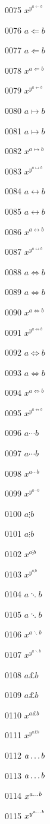 \documentclass{article}
\begin{document}
0075 $x^{y^{a\longleftarrow b}}$\par
0076 $a\Longleftarrow b$\par
0077 $\displaystyle a\Longleftarrow b$\par
0078 $x^{a\Longleftarrow b}$\par
0079 $x^{y^{a\Longleftarrow b}}$\par
0080 $a\longmapsto b$\par
0081 $\displaystyle a\longmapsto b$\par
0082 $x^{a\longmapsto b}$\par
0083 $x^{y^{a\longmapsto b}}$\par
0084 $a\longleftrightarrow b$\par
0085 $\displaystyle a\longleftrightarrow b$\par
0086 $x^{a\longleftrightarrow b}$\par
0087 $x^{y^{a\longleftrightarrow b}}$\par
0088 $a\Longleftrightarrow b$\par
0089 $\displaystyle a\Longleftrightarrow b$\par
0090 $x^{a\Longleftrightarrow b}$\par
0091 $x^{y^{a\Longleftrightarrow b}}$\par
0092 $a\iff b$\par
0093 $\displaystyle a\iff b$\par
0094 $x^{a\iff b}$\par
0095 $x^{y^{a\iff b}}$\par
0096 $a\cdots b$\par
0097 $\displaystyle a\cdots b$\par
0098 $x^{a\cdots b}$\par
0099 $x^{y^{a\cdots b}}$\par
0100 $a\vdots b$\par
0101 $\displaystyle a\vdots b$\par
0102 $x^{a\vdots b}$\par
0103 $x^{y^{a\vdots b}}$\par
0104 $a\ddots b$\par
0105 $\displaystyle a\ddots b$\par
0106 $x^{a\ddots b}$\par
0107 $x^{y^{a\ddots b}}$\par
0108 $a\mathsterling b$\par
0109 $\displaystyle a\mathsterling b$\par
0110 $x^{a\mathsterling b}$\par
0111 $x^{y^{a\mathsterling b}}$\par
0112 $a\mathellipsis b$\par
0113 $\displaystyle a\mathellipsis b$\par
0114 $x^{a\mathellipsis b}$\par
0115 $x^{y^{a\mathellipsis b}}$\par
\end{document}
